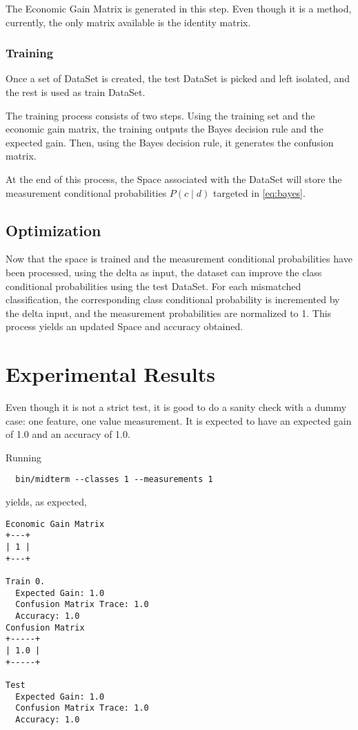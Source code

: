 \documentclass[letterpaper, conference]{IEEEtran}
\begin{document}
The Economic Gain Matrix is generated in this step. Even though it is a method, currently, the only matrix available is the identity matrix.

\subsubsection{Training}

Once a set of DataSet is created, the test DataSet is picked and left isolated, and the rest is used as train DataSet.

The training process consists of two steps. Using the training set and the economic gain matrix, the training outputs the Bayes decision rule and the expected gain. Then, using the Bayes decision rule, it generates the confusion matrix.


At the end of this process, the Space associated with the DataSet will store the measurement conditional probabilities $P(c \mid d)$ targeted in \ref{eq:bayes}.

\subsection{Optimization}

Now that the space is trained and the measurement conditional probabilities have been processed, using the delta as input, the dataset can improve the class conditional probabilities using the test DataSet. For each mismatched classification, the corresponding class conditional probability is incremented by the delta input, and the measurement probabilities are normalized to 1. This process yields an updated Space and accuracy obtained.

\section{Experimental Results}

Even though it is not a strict test, it is good to do a sanity check with a dummy case: one feature, one value measurement. It is expected to have an expected gain of 1.0 and an accuracy of 1.0.

Running

\begin{verbatim}
  bin/midterm --classes 1 --measurements 1
\end{verbatim}

yields, as expected,

\begin{verbatim}
Economic Gain Matrix
+---+
| 1 |
+---+

Train 0.
  Expected Gain: 1.0
  Confusion Matrix Trace: 1.0
  Accuracy: 1.0
Confusion Matrix
+-----+
| 1.0 |
+-----+

Test
  Expected Gain: 1.0
  Confusion Matrix Trace: 1.0
  Accuracy: 1.0
\end{verbatim}
\end{document}

